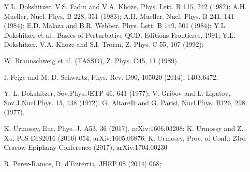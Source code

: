\documentclass{PoS}
\begin{document}
\begin{thebibliography}{99}






Y.L. Dokshitzer, V.S. Fadin and V.A. Khoze, Phys. Lett. B 115, 242 (1982); 
A.H. Mueller, Nucl. Phys. B 228, 351 (1983); 
A.H. Mueller, Nucl. Phys. B 241, 141 (1984); 
E.D. Malaza and B.R. Webber, Phys. Lett. B 149, 501 (1984); 
Y.L. Dokshitzer et al., Basics of Perturbative QCD. Editions Frontieres, 1991; 
Y.L. Dokshitzer, V.A. Khoze and S.I. Troian, Z. Phys. C 55, 107 (1992); 

W. Braunschweig et al. (TASSO), Z. Phys. C45, 11 (1989).

I. Feige and M. D. Schwartz, Phys. Rev. D90, 105020 (2014), 1403.6472.

Y. L. Dokshitzer, Sov.Phys.JETP 46, 641 (1977); V. Gribov and L. Lipatov, Sov.J.Nucl.Phys. 15, 438 (1972); G. Altarelli and G. Parisi, Nucl.Phys. B126, 298 (1977).

K. Urmossy, Eur. Phys. J. A53, 36 (2017), arXiv:1606.03208; K. Urmossy and Z. Xu, PoS DIS2016 (2016) 054, arXiv:1605.06876; K. Urmossy, Proc. of Conf.: 23rd Cracow Epiphany Conference (2017), arXiv:1704.00230

R. Perez-Ramos, D. d'Enterria, JHEP 08 (2014) 068; 

\end{thebibliography}
\end{document}
